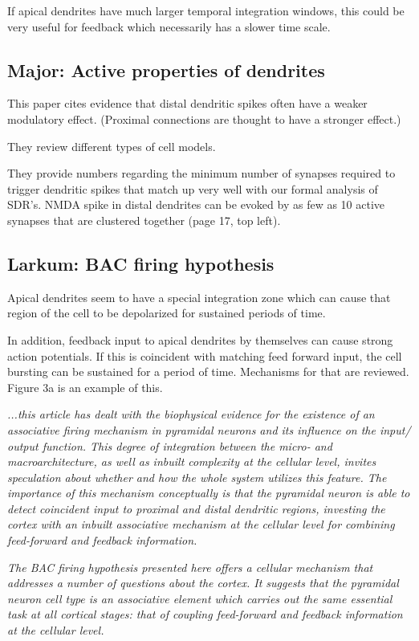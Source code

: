 \documentclass{article} %
\begin{document}
If apical dendrites have much larger temporal integration windows, this could be
very useful for feedback which necessarily has a slower time scale.

\subsection{Major: Active properties of dendrites}

This paper \cite{Major2013} cites evidence that distal dendritic spikes often
have a weaker modulatory effect. (Proximal connections are thought to have a
stronger effect.)

They review different types of cell models.

They provide numbers regarding the minimum number of synapses required to
trigger dendritic spikes that match up very well with our formal analysis of
SDR’s.  NMDA spike in distal dendrites can be evoked by as few as 10 active
synapses that are clustered together (page 17, top left).

\subsection{Larkum: BAC firing hypothesis}

Apical dendrites seem to have a special integration zone which can cause that
region of the cell to be depolarized for sustained periods of time.

In addition, feedback input to apical dendrites by themselves can cause strong
action potentials.   If this is coincident with matching feed forward input, the
cell bursting can be sustained for a period of time. Mechanisms for that are
reviewed. Figure 3a is an example of this.

\emph{
...this article \cite{Larkum2013} has dealt with the biophysical
evidence for the existence of an associative firing mechanism in pyramidal
neurons and its influence on the input/ output function. This degree of
integration between the micro- and macroarchitecture, as well as inbuilt
complexity at the cellular level, invites speculation about whether and how the
whole system utilizes this feature. The importance of this mechanism
conceptually is that the pyramidal neuron is able to detect coincident input to
proximal and distal dendritic regions, investing the cortex with an inbuilt
associative mechanism at the cellular level for combining feed-forward and
feedback information.}

\emph{The BAC firing hypothesis presented here offers a cellular mechanism that
addresses a number of questions about the cortex. It suggests that the
pyramidal neuron cell type is an associative element which carries out the same
essential task at all cortical stages: that of coupling feed-forward and
feedback information at the cellular level.}
\end{document}
